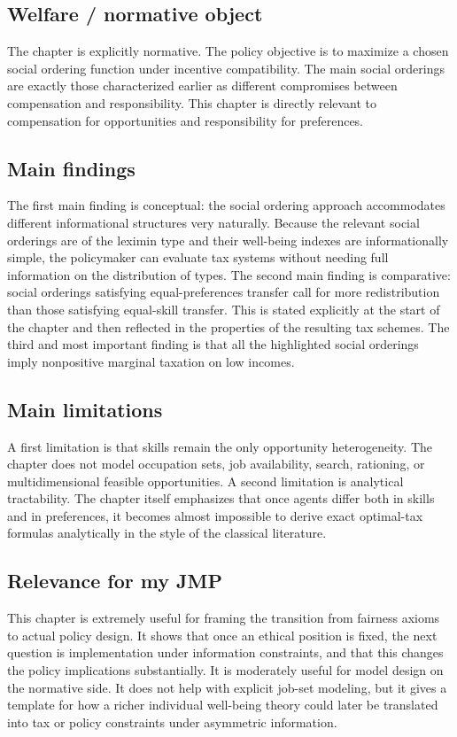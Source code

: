 \documentclass[11pt,a4paper]{article}
\begin{document}
\subsection*{Welfare / normative object}
The chapter is explicitly normative. The policy objective is to maximize a chosen social ordering function under incentive compatibility. The main social orderings are exactly those characterized earlier as different compromises between compensation and responsibility. This chapter is directly relevant to compensation for opportunities and responsibility for preferences.

\subsection*{Main findings}
The first main finding is conceptual: the social ordering approach accommodates different informational structures very naturally. Because the relevant social orderings are of the leximin type and their well-being indexes are informationally simple, the policymaker can evaluate tax systems without needing full information on the distribution of types. The second main finding is comparative: social orderings satisfying equal-preferences transfer call for more redistribution than those satisfying equal-skill transfer. This is stated explicitly at the start of the chapter and then reflected in the properties of the resulting tax schemes. The third and most important finding is that all the highlighted social orderings imply nonpositive marginal taxation on low incomes.

\subsection*{Main limitations}
A first limitation is that skills remain the only opportunity heterogeneity. The chapter does not model occupation sets, job availability, search, rationing, or multidimensional feasible opportunities. A second limitation is analytical tractability. The chapter itself emphasizes that once agents differ both in skills and in preferences, it becomes almost impossible to derive exact optimal-tax formulas analytically in the style of the classical literature.

\subsection*{Relevance for my JMP}
This chapter is extremely useful for framing the transition from fairness axioms to actual policy design. It shows that once an ethical position is fixed, the next question is implementation under information constraints, and that this changes the policy implications substantially. It is moderately useful for model design on the normative side. It does not help with explicit job-set modeling, but it gives a template for how a richer individual well-being theory could later be translated into tax or policy constraints under asymmetric information.
\end{document}
